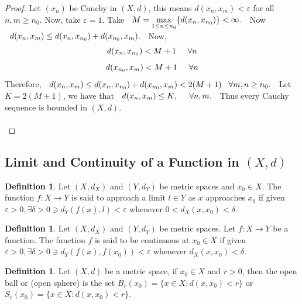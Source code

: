 \documentclass[11pt,a4paper]{article}
\theoremstyle{definition}
\newtheorem{defn}[thm]{Definition}
\begin{document}
\begin{proof}
Let $(x_n)$ be Cauchy in $(X,d)$, this means $d(x_n,x_m)<\varepsilon$ for all $n,m\geq n_0$. Now, take $\varepsilon =1$. Take $\hspace{0.2cm}\displaystyle{ M=\max_{1\leq n\leq n_0}\{d(x_n,x_{n_0})\}<\infty}.\hspace{0.2cm}$ Now $\hspace{0.2cm} \displaystyle{d(x_n,x_m)\leq d(x_n,x_{n_0})+d(x_{n_0},x_m)}.\hspace{0.2cm}$ Now, $$d(x_n,x_{n_0})<M+1\hspace{0.5cm} \forall n$$ $$d(x_{n_0},x_m)<M+1\hspace{0.5cm} \forall n$$ Therefore, $\hspace{0.2cm} \displaystyle{d(x_n,x_m)\leq d(x_n,x_{n_0})+d(x_{n_0},x_m)<2(M+1)\hspace{0.3cm} \forall m,n\geq n_0}.\hspace{0.2cm}$ Let $K=2(M+1)$, we have that $\hspace{0.2cm} \displaystyle{d(x_n,x_m)\leq K,\hspace{0.5cm} \forall n,m}.\hspace{0.2cm}$ Thus every Cauchy sequence is bounded in $(X,d)$.\\\\
\end{proof}


\pagebreak
\subsection{Limit and Continuity of a Function in $(X,d)$}

\begin{defn}
Let $(X,d_X)$ and $(Y,d_Y)$ be metric spaces and $x_0\in X$. The function $f:X\rightarrow Y$ is said to approach a limit $l\in Y$ as $x$ approaches $x_0$ if given $\varepsilon >0, \exists \delta >0\ni d_Y(f(x),l)<\varepsilon$ whenever $0<d_X(x,x_0)<\delta$.

\end{defn}


\begin{defn}
Let $(X,d_X)$ and $(Y,d_Y)$ be metric spaces. Let $f:X\rightarrow Y$ be a function. The function $f$ is said to be continuous at $x_0\in X$ if given $\varepsilon >0,\exists \delta >0\ni d_Y(f(x),f(x_0))<\varepsilon$ whenever $d_X(x,x_0)<\delta$.

\end{defn}


\begin{defn}
Let $(X,d)$ be a metric space, if $x_0\in X$ and $r>0$, then the open ball or (open sphere) is the set $B_r(x_0)=\{x\in X:d(x,x_0)<r\}$ or $S_r(x_0)=\{x\in X:d(x,x_0)<r\}.$

\end{defn}
\end{document}
